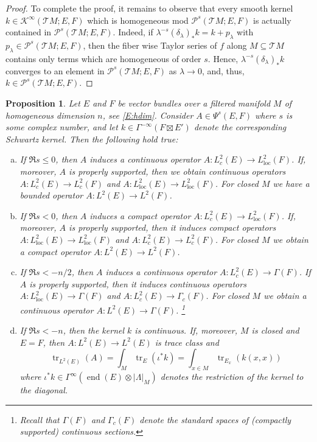 \documentclass[reqno,12pt]{amsart}
\DeclareMathOperator{\tr}{tr}
\DeclareMathOperator{\eend}{end}
\newcommand\loc{\textrm{loc}}
\theoremstyle{plain}
\newtheorem{proposition}[theorem]{Proposition}
\theoremstyle{definition}
\begin{document}
\begin{proof}
To complete the proof, it remains to observe that every smooth kernel $k\in\mathcal K^\infty(\mathcal TM;E,F)$ which is homogeneous mod $\mathcal P^s(\mathcal TM;E,F)$ is actually contained in $\mathcal P^s(\mathcal TM;E,F)$.
Indeed, if $\lambda^{-s}(\delta_\lambda)_*k=k+p_\lambda$ with $p_\lambda\in\mathcal P^s(\mathcal TM;E,F)$, then the fiber wise Taylor series of $f$ along $M\subseteq\mathcal TM$ contains only terms which are homogeneous of order $s$.
Hence, $\lambda^{-s}(\delta_\lambda)_*k$ converges to an element in $\mathcal P^s(\mathcal TM;E,F)$ as $\lambda\to0$, and, thus, $k\in\mathcal P^s(\mathcal TM;E,F)$.
\end{proof}


\begin{proposition}\label{P:Psimap}
Let $E$ and $F$ be vector bundles over a filtered manifold $M$ of homogeneous dimension $n$, see \eqref{E:hdim}.
Consider $A\in\Psi^s(E,F)$ where $s$ is some complex number, and let $k\in\Gamma^{-\infty}(F\boxtimes E')$ denote the corresponding Schwartz kernel.
Then the following hold true:
\begin{enumerate}[(a)]
\item\label{P:Psimap:L2cont}
If $\Re s\leq0$, then $A$ induces a continuous operator $A\colon L^2_c(E)\to L^2_\loc(F)$.
If, moreover, $A$ is properly supported, then we obtain continuous operators $A\colon L^2_c(E)\to L^2_c(F)$ and $A\colon L^2_\loc(E)\to L^2_\loc(F)$.
For closed $M$ we have a bounded operator $A\colon L^2(E)\to L^2(F)$.
\item\label{P:Psimap:compact}
If $\Re s<0$, then $A$ induces a compact operator $A\colon L^2_c(E)\to L^2_\loc(F)$.
If, moreover, $A$ is properly supported, then it induces compact operators $A\colon L^2_\loc(E)\to L^2_\loc(F)$ and $A\colon L^2_c(E)\to L_c^2(F)$.
For closed $M$ we obtain a compact operator $A\colon L^2(E)\to L^2(F)$.
\item\label{P:Psimap:kL2}
If $\Re s<-n/2$, then $A$ induces a continuous operator $A\colon L^2_c(E)\to\Gamma(F)$.
If $A$ is properly supported, then it induces continuous operators $A\colon L^2_\loc(E)\to\Gamma(F)$ and $A\colon L^2_c(E)\to\Gamma_c(F)$.
For closed $M$ we obtain a continuous operator $A\colon L^2(E)\to\Gamma(F)$.
\footnote{Recall that $\Gamma(F)$ and $\Gamma_c(F)$ denote the standard spaces of (compactly supported) continuous sections.}
\item\label{P:Psimap:cont}
If $\Re s<-n$, then the kernel $k$ is continuous.
If, moreover, $M$ is closed and $E=F$, then $A\colon L^2(E)\to L^2(E)$ is trace class and
$$
\tr_{L^2(E)}(A)=\int_M\tr_E(\iota^*k)=\int_{x\in M}\tr_{E_x}(k(x,x))
$$
where $\iota^*k\in\Gamma^\infty(\eend(E)\otimes|\Lambda|_M)$ denotes the restriction of the kernel to the diagonal.
\end{enumerate}
\end{proposition}
\end{document}
